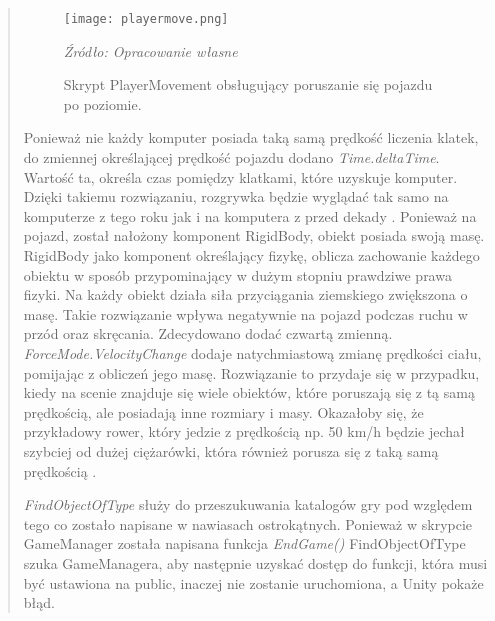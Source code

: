 \begin{quotation}
\begin{figure}[!h]
\centering
  \texttt{[image: playermove.png]}
  \caption{Skrypt PlayerMovement obsługujący poruszanie się pojazdu po poziomie.}\label{rys_21}
  \begin{minipage}[t]{0.75\linewidth}
    \emph{Źródło: Opracowanie własne}
  \end{minipage}
\end{figure}

\newpage
\indent Ponieważ nie każdy komputer posiada taką samą prędkość liczenia klatek, do zmiennej określającej prędkość pojazdu dodano \textit{Time.del\-taTime}. Wartość ta, określa czas pomiędzy klatkami, które uzyskuje komputer. Dzięki takiemu rozwiązaniu, rozgrywka będzie wyglądać tak samo na komputerze z tego roku jak i na komputera z przed dekady \cite{4}. Ponieważ na pojazd, został nałożony komponent RigidBody, obiekt posiada swoją masę. RigidBody jako komponent określający fizykę, oblicza zachowanie każdego obiektu w sposób przypominający w dużym stopniu prawdziwe prawa fizyki. Na każdy obiekt działa siła przyciągania ziemskiego zwiększona o masę. Takie rozwiązanie wpływa negatywnie na pojazd podczas ruchu w przód oraz skręcania. Zdecydowano dodać czwartą zmienną. \textit{ForceMode.VelocityChange} dodaje natychmiastową zmianę prędkości ciału, pomijając z obliczeń jego masę. Rozwiązanie to przydaje się w przypadku, kiedy na scenie znajduje się wiele obiektów, które poruszają się z tą samą prędkością, ale posiadają inne rozmiary i masy. Okazałoby się, że przykładowy rower, który jedzie z prędkością np. 50 km/h będzie jechał szybciej od dużej ciężarówki, która również porusza się z taką samą prędkością \cite{5}.

\indent \textit{FindObjectOfType} służy do przeszukuwania katalogów gry pod względem tego co zostało napisane w nawiasach ostrokątnych. Ponieważ w skrypcie GameManager została napisana funkcja \textit{EndGame()} FindObjectOfType szuka GameManagera, aby następnie uzyskać dostęp do funkcji, która musi być ustawiona na public, inaczej nie zostanie uruchomiona, a Unity pokaże błąd.


\end{quotation}
